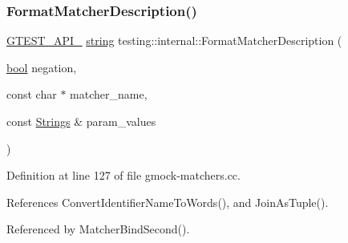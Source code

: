 \subsubsection{\texorpdfstring{Format\+Matcher\+Description()}{FormatMatcherDescription()}}
{\footnotesize\ttfamily \hyperlink{gtest-port_8h_aa73be6f0ba4a7456180a94904ce17790}{G\+T\+E\+S\+T\+\_\+\+A\+P\+I\+\_\+} \hyperlink{namespacetesting_1_1internal_a8e8ff5b11e64078831112677156cb111}{string} testing\+::internal\+::\+Format\+Matcher\+Description (\begin{DoxyParamCaption}\item[{\hyperlink{classbool}{bool}}]{negation,  }\item[{const char $\ast$}]{matcher\+\_\+name,  }\item[{const \hyperlink{namespacetesting_1_1internal_a7706b17f05f4b49e351b052ae4e05073}{Strings} \&}]{param\+\_\+values }\end{DoxyParamCaption})}



Definition at line 127 of file gmock-\/matchers.\+cc.



References Convert\+Identifier\+Name\+To\+Words(), and Join\+As\+Tuple().



Referenced by Matcher\+Bind\+Second().


